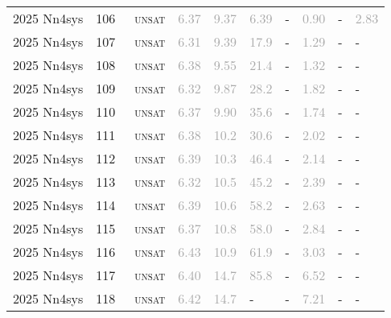 \begin{center}
{\begin{longtable}{@{}llllllllll@{}}
2025 Nn4sys & 106 & ~\textsc{unsat} & \textcolor{darkgray}{6.37} & \textcolor{darkgray}{9.37} & \textcolor{darkgray}{6.39} & - & \textcolor{darkgray}{0.90} & - & \textcolor{darkgray}{2.83} \\
2025 Nn4sys & 107 & ~\textsc{unsat} & \textcolor{darkgray}{6.31} & \textcolor{darkgray}{9.39} & \textcolor{darkgray}{17.9} & - & \textcolor{darkgray}{1.29} & - & - \\
2025 Nn4sys & 108 & ~\textsc{unsat} & \textcolor{darkgray}{6.38} & \textcolor{darkgray}{9.55} & \textcolor{darkgray}{21.4} & - & \textcolor{darkgray}{1.32} & - & - \\
2025 Nn4sys & 109 & ~\textsc{unsat} & \textcolor{darkgray}{6.32} & \textcolor{darkgray}{9.87} & \textcolor{darkgray}{28.2} & - & \textcolor{darkgray}{1.82} & - & - \\
2025 Nn4sys & 110 & ~\textsc{unsat} & \textcolor{darkgray}{6.37} & \textcolor{darkgray}{9.90} & \textcolor{darkgray}{35.6} & - & \textcolor{darkgray}{1.74} & - & - \\
2025 Nn4sys & 111 & ~\textsc{unsat} & \textcolor{darkgray}{6.38} & \textcolor{darkgray}{10.2} & \textcolor{darkgray}{30.6} & - & \textcolor{darkgray}{2.02} & - & - \\
2025 Nn4sys & 112 & ~\textsc{unsat} & \textcolor{darkgray}{6.39} & \textcolor{darkgray}{10.3} & \textcolor{darkgray}{46.4} & - & \textcolor{darkgray}{2.14} & - & - \\
2025 Nn4sys & 113 & ~\textsc{unsat} & \textcolor{darkgray}{6.32} & \textcolor{darkgray}{10.5} & \textcolor{darkgray}{45.2} & - & \textcolor{darkgray}{2.39} & - & - \\
2025 Nn4sys & 114 & ~\textsc{unsat} & \textcolor{darkgray}{6.39} & \textcolor{darkgray}{10.6} & \textcolor{darkgray}{58.2} & - & \textcolor{darkgray}{2.63} & - & - \\
2025 Nn4sys & 115 & ~\textsc{unsat} & \textcolor{darkgray}{6.37} & \textcolor{darkgray}{10.8} & \textcolor{darkgray}{58.0} & - & \textcolor{darkgray}{2.84} & - & - \\
2025 Nn4sys & 116 & ~\textsc{unsat} & \textcolor{darkgray}{6.43} & \textcolor{darkgray}{10.9} & \textcolor{darkgray}{61.9} & - & \textcolor{darkgray}{3.03} & - & - \\
2025 Nn4sys & 117 & ~\textsc{unsat} & \textcolor{darkgray}{6.40} & \textcolor{darkgray}{14.7} & \textcolor{darkgray}{85.8} & - & \textcolor{darkgray}{6.52} & - & - \\
2025 Nn4sys & 118 & ~\textsc{unsat} & \textcolor{darkgray}{6.42} & \textcolor{darkgray}{14.7} & - & - & \textcolor{darkgray}{7.21} & - & - \\

\end{longtable}}
\end{center}
